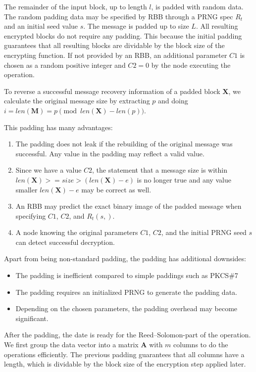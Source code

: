 The remainder of the input block, up to length $l$, is padded with random data. The random padding data may be specified by RBB through a PRNG spec $R_t$ and an initial seed value $s$. The message is padded up to size $L$. All resulting encrypted blocks do not require any padding. This because the initial padding guarantees that all resulting blocks are dividable by the block size of the encrypting function. If not provided by an RBB, an additional parameter $C1$ is chosen as a random positive integer and $C2=0$  by the node executing the operation.

To reverse a successful message recovery information of a padded block $\mathbf{X}$, we calculate the original message size by extracting $p$ and doing $i=len(\mathbf{M})=p \pmod{ len\left(\mathbf{X}\right)-len\left(p\right) }$.

This padding has many advantages:
\begin{enumerate}
	\item The padding does not leak if the rebuilding of the original message was successful. Any value in the padding may reflect a valid value.
	\item Since we have a value $C2$, the statement that a message size is within $len(\mathbf{X})>=size>(len(\mathbf{X})-e)$ is no longer true and any value smaller $len(\mathbf{X})-e$ may be correct as well.
	\item An RBB may predict the exact binary image of the padded message when specifying $C1$, $C2$, and $R_{t}(s,)$.
	\item A node knowing the original parameters $C1$, $C2$, and the initial PRNG seed $s$ can detect successful decryption.
\end{enumerate}

Apart from being non-standard padding, the padding has additional downsides:
\begin{itemize}
	\item The padding is inefficient compared to simple paddings such as PKCS\#7
	\item The padding requires an initialized PRNG to generate the padding data.
	\item Depending on the chosen parameters, the padding overhead may become significant. 
\end{itemize}

After the padding, the date is ready for the Reed--Solomon-part of the operation. We first group the data vector into a matrix $\mathbf{A}$ with $m$ columns to do the operations efficiently. The previous padding guarantees that all columns have a length, which is dividable by the block size of the encryption step applied later.

